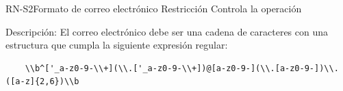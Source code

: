 \begin{BusinessRule}{RN-S2}{Formato de correo electrónico}
	{Restricción}
	{Controla la operación}
	\item[Descripción:] El correo electrónico debe ser una cadena de caracteres con una estructura que cumpla la siguiente expresión regular:
	\begin{verbatim}
	\\b^['_a-z0-9-\\+](\\.['_a-z0-9-\\+])@[a-z0-9-](\\.[a-z0-9-])\\.([a-z]{2,6})\\b
	\end{verbatim}
	
\end{BusinessRule}

